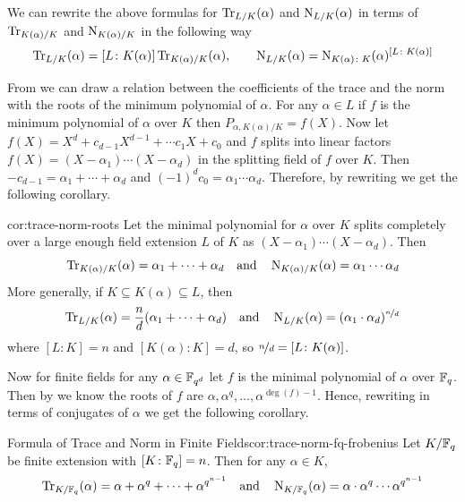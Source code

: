\begin{observation}
  We can rewrite the above formulas for $\operatorname{Tr}_{L/K}(\alpha)$ and $
    \operatorname{N}_{L/K}(\alpha)$ in terms of $\operatorname{Tr}_{K(\alpha)/K}$ and $
    \operatorname{N}_{K(\alpha)/K}$ in the following way $$\operatorname{Tr}_{L/K}(\alpha)=[L\colon K(\alpha)]\operatorname{Tr}_{K(\alpha)/K}(\alpha),\qquad \operatorname{N}_{L/K}(\alpha)=\operatorname{N}_{K(\alpha)\colon K}(\alpha)^{[L\colon K(\alpha)]}$$
\end{observation}

From \TraceNormMinPolyCoeffscor we can draw a relation between the coefficients of the trace and the norm with the roots of the minimum polynomial of $\alpha$. For any $\alpha\in L$ if $f$ is the minimum polynomial of $\alpha$ over $K$ then $P_{\alpha,K(\alpha)/K}=f(X)$. Now let $f(X)=X^d+c_{d-1}X^{d-1}+\cdots c_1X+c_0$ and $f$ splits into linear factors $f(X)=(X-\alpha_1)\cdots (X-\alpha_d)$ in the splitting field of $f$ over $K$. Then $-c_{d-1}=\alpha_1+\cdots +\alpha_d$ and $(-1)^dc_0=\alpha_1\cdots \alpha_d$. Therefore, by rewriting \TraceNormMinPolyCoeffscor we get the following corollary.
\begin{corolary}{}{cor:trace-norm-roots}
  Let the minimal polynomial for $\alpha$ over $K$ splits completely over a large enough field extension $L$ of $K$ as $(X-\alpha_1)\cdots (X-\alpha_d)$. Then $$\operatorname{Tr}_{K(\alpha)/K}(\alpha)=\alpha_1+\cdots+\alpha_d\quad\text{and}\quad
    \operatorname{N}_{K(\alpha)/K}(\alpha)=\alpha_1\cdots\alpha_d$$
  More generally, if $K\subseteq K(\alpha)\subseteq L$, then $$\operatorname{Tr}_{L/K}(\alpha)=\frac{n}d(\alpha_1+\cdots+\alpha_d)\quad\text{and}\quad
    \operatorname{N}_{L/K}(\alpha)=(\alpha_1\cdot \alpha_d)^{\nicefrac{n}d}$$where $[L\colon K]=n$ and $[K(\alpha)\colon K]=d$, so $\nicefrac{n}d=[L\colon K(\alpha)]$.
\end{corolary}

Now for finite fields for any $\alpha\in\mathbb{F}_{q^d}$ let $f$ is the minimal polynomial of $\alpha$  over $\mathbb{F}_q$. Then by \IrrRootsConjugatesthm we know the roots of $f$ are $\alpha,\alpha^q,\dots, \alpha^{\deg(f)-1}$. Hence, rewriting \TraceNormRootscor in terms of conjugates of $\alpha$ we get the following corollary.
\begin{corolary}{Formula of Trace and Norm in Finite Fields}{cor:trace-norm-fq-frobenius}
  Let $K/\mathbb{F}_q$ be finite extension with $[K\colon \mathbb{F}_q]=n$. Then for any $\alpha\in K$, $$\operatorname{Tr}_{K/\mathbb{F}_q}(\alpha)=\alpha+\alpha^q+\cdots+\alpha^{q^{n-1}}\quad\text{and}\quad \operatorname{N}_{K/\mathbb{F}_q}(\alpha)=\alpha\cdot \alpha^q\cdots\alpha^{q^{n-1}}$$
\end{corolary}

